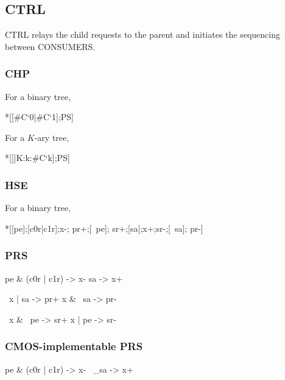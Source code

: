 \documentclass{article}
\begin{document}
\subsection{CTRL}

CTRL relays the child requests to the parent 
and initiates the sequencing between CONSUMERS.

\subsubsection*{CHP}

For a binary tree,

\begin{csp}
*[[#{C`0}|#{C`1}];P\*S]
\end{csp}

\noindent For a $K$-ary tree,

\begin{csp}
*[[\langle|K:k:#{C`k}\rangle];P\*S]
\end{csp}

\subsubsection*{HSE}

For a binary tree,

\begin{hse}
*[[pe];[c0r|c1r];x-;
  pr+;[~pe];
  sr+;[sa];x+;sr-;[~sa];
  pr-]
\end{hse}

\subsubsection*{PRS}

\begin{prs2}
pe & (c0r | c1r) -> x-
sa -> x+
\end{prs2}

\begin{prs2}
~x | sa -> pr+
x & ~sa -> pr-
\end{prs2}

\begin{prs2}
~x & ~pe -> sr+
x | pe -> sr-
\end{prs2}

\subsubsection*{CMOS-implementable PRS}

\begin{prs2}
pe & (c0r | c1r) -> x-
~_sa -> x+
\end{prs2}
\end{document}
